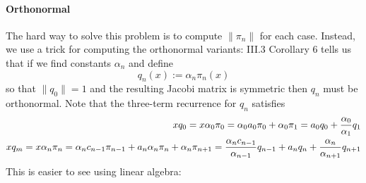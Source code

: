 \documentclass[12pt,a4paper]{article}
\begin{document}
\paragraph{Orthonormal}
The hard way to solve this problem is to compute $\|\ensuremath{\pi}_n\|$ for each case. Instead, we use a trick for computing the orthonormal  variants: III.3 Corollary 6 tells us that if we find constants $\ensuremath{\alpha}_n$ and define
\[
q_n(x) := \ensuremath{\alpha}_n \ensuremath{\pi}_n(x)
\]
so that $\|q_0\| = 1$ and the resulting Jacobi matrix is symmetric then $q_n$ must be orthonormal. Note that the three-term recurrence for $q_n$ satisfies
\begin{align*}
x q_0 = x \ensuremath{\alpha}_0 \ensuremath{\pi}_0 = \ensuremath{\alpha}_0 a_0 \ensuremath{\pi}_0 + \ensuremath{\alpha}_0 \ensuremath{\pi}_1 = a_0 q_0 + {\ensuremath{\alpha}_0 \over \ensuremath{\alpha}_1} q_1 \\
x q_m = x \ensuremath{\alpha}_n \ensuremath{\pi}_n = \ensuremath{\alpha}_n c_{n-1} \ensuremath{\pi}_{n-1} +  a_n \ensuremath{\alpha}_n \ensuremath{\pi}_n + \ensuremath{\alpha}_n \ensuremath{\pi}_{n+1} = {\ensuremath{\alpha}_n c_{n-1} \over \ensuremath{\alpha}_{n-1}}  q_{n-1} + a_n q_n + {\ensuremath{\alpha}_n \over \ensuremath{\alpha}_{n+1}} q_{n+1}
\end{align*}
This is easier to see using linear algebra:
\end{document}
